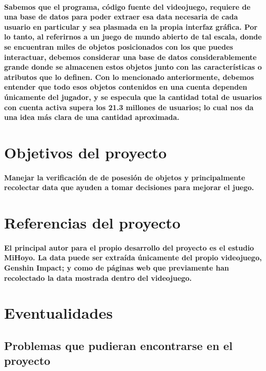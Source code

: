 \documentclass{report}
\begin{document}
\paragraph{Sabemos que el programa, código fuente del videojuego, requiere de una base de datos para poder extraer esa data necesaria de cada usuario en particular y sea plasmada en la propia interfaz gráfica. Por lo tanto, al referirnos a un juego de mundo abierto de tal escala, donde se encuentran miles de objetos posicionados con los que puedes interactuar, debemos considerar una base de datos considerablemente grande donde se almacenen estos objetos junto con las características o atributos que lo definen. Con lo mencionado anteriormente, debemos entender que todo esos objetos contenidos en una cuenta dependen únicamente del jugador, y se especula que la cantidad total de usuarios con cuenta activa supera los 21.3 millones de usuarios; lo cual nos da una idea más clara de una cantidad aproximada. }

\section{ Objetivos del proyecto}
\paragraph{Manejar la verificación de de posesión de objetos y principalmente recolectar data que 
ayuden a tomar decisiones para mejorar el juego.}

\section{Referencias del proyecto}
\paragraph{El principal autor para el propio desarrollo del proyecto es el estudio MiHoyo. La data puede ser extraída únicamente del propio videojuego, Genshin Impact; y como de páginas web que previamente han recolectado la data mostrada dentro del videojuego. }

\section{Eventualidades}
\subsection{Problemas que pudieran encontrarse en el proyecto}
\end{document}
